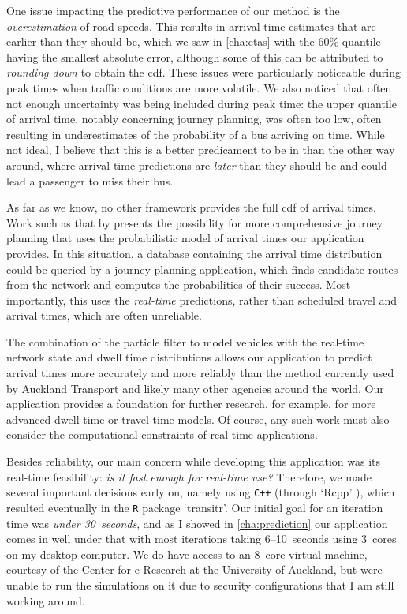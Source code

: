 One issue impacting the predictive performance of our method is the \emph{overestimation} of road speeds. This results in arrival time estimates that are earlier than they should be, which we saw in \cref{cha:etas} with the 60\% quantile having the smallest absolute error, although some of this can be attributed to \emph{rounding down} to obtain the \gls{cdf}. These issues were particularly noticeable during peak times when traffic conditions are more volatile. We also noticed that often not enough uncertainty was being included during peak time: the upper quantile of arrival time, notably concerning journey planning, was often too low, often resulting in underestimates of the probability of a bus arriving on time. While not ideal, I believe that this is a better predicament to be in than the other way around, where arrival time predictions are \emph{later} than they should be and could lead a passenger to miss their bus.


As far as we know, no other framework provides the full \gls{cdf} of arrival times. Work such as that by \citet{Celan_2017,Celan_2018} presents the possibility for more comprehensive journey planning that uses the probabilistic model of arrival times our application provides. In this situation, a database containing the arrival time distribution could be queried by a journey planning application, which finds candidate routes from the network and computes the probabilities of their success. Most importantly, this uses the \emph{real-time} predictions, rather than scheduled travel and arrival times, which are often unreliable.


The combination of the particle filter to model vehicles with the real-time network state and dwell time distributions allows our application to predict arrival times more accurately and more reliably than the method currently used by Auckland Transport and likely many other agencies around the world. Our application provides a foundation for further research, for example, for more advanced dwell time or travel time models. Of course, any such work must also consider the computational constraints of real-time applications.


Besides reliability, our main concern while developing this application was its real-time feasibility: \emph{is it fast enough for real-time use?} Therefore, we made several important decisions early on, namely using \verb_C++_ (through `Rcpp' \citep{Rcpp}), which resulted eventually in the \verb+R+ package `transitr'. Our initial goal for an iteration time was \emph{under 30~seconds}, and as I showed in \cref{cha:prediction} our application comes in well under that with most iterations taking 6--10~seconds using 3~cores on my desktop computer. We do have access to an 8~core virtual machine, courtesy of the Center for e-Research at the University of Auckland, but were unable to run the simulations on it due to security configurations that I am still working around.


